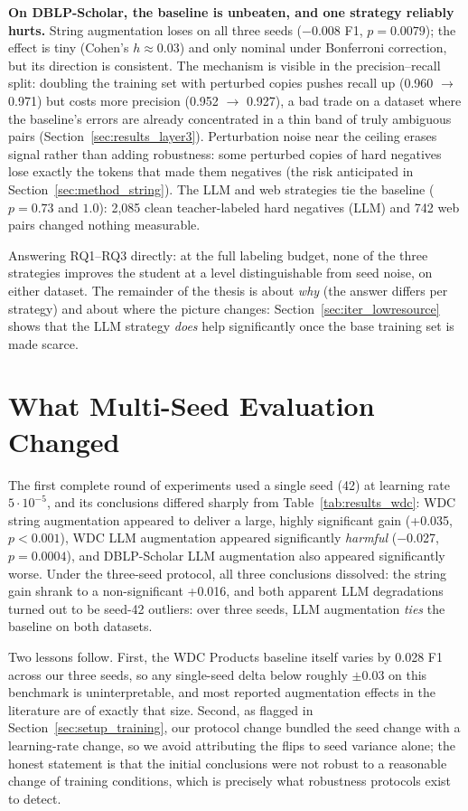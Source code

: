 \documentclass[a4paper,oneside,bibliography=totoc]{scrbook}
\begin{document}
\textbf{On DBLP-Scholar, the baseline is unbeaten, and one strategy reliably hurts.} String augmentation loses on all three seeds ($-$0.008 F1, $p = 0.0079$); the effect is tiny (Cohen's $h \approx 0.03$) and only nominal under Bonferroni correction, but its direction is consistent. The mechanism is visible in the precision--recall split: doubling the training set with perturbed copies pushes recall up (0.960 $\rightarrow$ 0.971) but costs more precision (0.952 $\rightarrow$ 0.927), a bad trade on a dataset where the baseline's errors are already concentrated in a thin band of truly ambiguous pairs (Section~\ref{sec:results_layer3}). Perturbation noise near the ceiling erases signal rather than adding robustness: some perturbed copies of hard negatives lose exactly the tokens that made them negatives (the risk anticipated in Section~\ref{sec:method_string}). The LLM and web strategies tie the baseline ($p = 0.73$ and $1.0$): 2{,}085 clean teacher-labeled hard negatives (LLM) and 742 web pairs changed nothing measurable.

Answering RQ1--RQ3 directly: at the full labeling budget, none of the three strategies improves the student at a level distinguishable from seed noise, on either dataset. The remainder of the thesis is about \emph{why} (the answer differs per strategy) and about where the picture changes: Section~\ref{sec:iter_lowresource} shows that the LLM strategy \emph{does} help significantly once the base training set is made scarce.

\section{What Multi-Seed Evaluation Changed}
\label{sec:results_seeds}

The first complete round of experiments used a single seed (42) at learning rate $5 \cdot 10^{-5}$, and its conclusions differed sharply from Table~\ref{tab:results_wdc}: WDC string augmentation appeared to deliver a large, highly significant gain (+0.035, $p < 0.001$), WDC LLM augmentation appeared significantly \emph{harmful} ($-$0.027, $p = 0.0004$), and DBLP-Scholar LLM augmentation also appeared significantly worse. Under the three-seed protocol, all three conclusions dissolved: the string gain shrank to a non-significant +0.016, and both apparent LLM degradations turned out to be seed-42 outliers: over three seeds, LLM augmentation \emph{ties} the baseline on both datasets.

Two lessons follow. First, the WDC Products baseline itself varies by 0.028 F1 across our three seeds, so any single-seed delta below roughly $\pm$0.03 on this benchmark is uninterpretable, and most reported augmentation effects in the literature are of exactly that size. Second, as flagged in Section~\ref{sec:setup_training}, our protocol change bundled the seed change with a learning-rate change, so we avoid attributing the flips to seed variance alone; the honest statement is that the initial conclusions were not robust to a reasonable change of training conditions, which is precisely what robustness protocols exist to detect.
\end{document}
